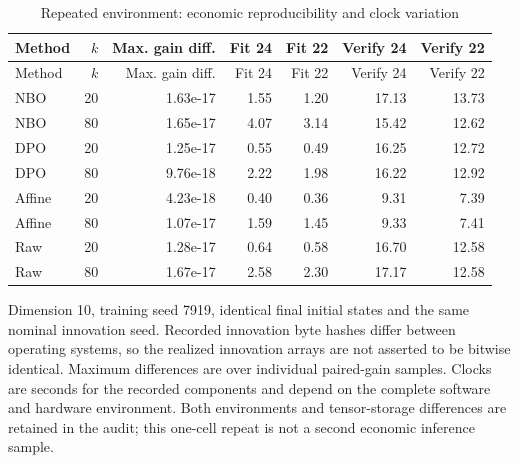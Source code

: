 \begingroup\small\setlength{\tabcolsep}{3pt}
\begin{longtable}{lrrrrrr}
\caption{Repeated environment: economic reproducibility and clock variation}\label{tab:r14environment}\\
\toprule
Method & $k$ & Max. gain diff. & Fit 24 & Fit 22 & Verify 24 & Verify 22\\\midrule
\endfirsthead
\toprule
Method & $k$ & Max. gain diff. & Fit 24 & Fit 22 & Verify 24 & Verify 22\\\midrule
\endhead
NBO & 20 & 1.63e-17 & 1.55 & 1.20 & 17.13 & 13.73\\
NBO & 80 & 1.65e-17 & 4.07 & 3.14 & 15.42 & 12.62\\
DPO & 20 & 1.25e-17 & 0.55 & 0.49 & 16.25 & 12.72\\
DPO & 80 & 9.76e-18 & 2.22 & 1.98 & 16.22 & 12.92\\
Affine & 20 & 4.23e-18 & 0.40 & 0.36 & 9.31 & 7.39\\
Affine & 80 & 1.07e-17 & 1.59 & 1.45 & 9.33 & 7.41\\
Raw & 20 & 1.28e-17 & 0.64 & 0.58 & 16.70 & 12.58\\
Raw & 80 & 1.67e-17 & 2.58 & 2.30 & 17.17 & 12.58\\
\bottomrule\end{longtable}
\noindent Dimension 10, training seed 7919, identical final initial states and the same nominal innovation seed. Recorded innovation byte hashes differ between operating systems, so the realized innovation arrays are not asserted to be bitwise identical. Maximum differences are over individual paired-gain samples. Clocks are seconds for the recorded components and depend on the complete software and hardware environment. Both environments and tensor-storage differences are retained in the audit; this one-cell repeat is not a second economic inference sample.
\endgroup
